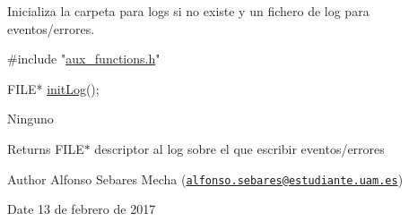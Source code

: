 Inicializa la carpeta para logs si no existe y un fichero de log para eventos/errores.


\begin{DoxyCode}
\textcolor{preprocessor}{#include "\hyperlink{aux__functions_8h}{aux\_functions.h}"}

FILE* \hyperlink{logger_8h_a1fa2e9d39664def63d53e3d576dc923f}{initLog}();
\end{DoxyCode}


Ninguno

\begin{DoxyReturn}{Returns}
F\-I\-L\-E$\ast$ descriptor al log sobre el que escribir eventos/errores
\end{DoxyReturn}
\begin{DoxyAuthor}{Author}
Alfonso Sebares Mecha (\href{mailto:alfonso.sebares@estudiante.uam.es}{\tt alfonso.\-sebares@estudiante.\-uam.\-es})
\end{DoxyAuthor}
\begin{DoxyDate}{Date}
13 de febrero de 2017
\end{DoxyDate}


 